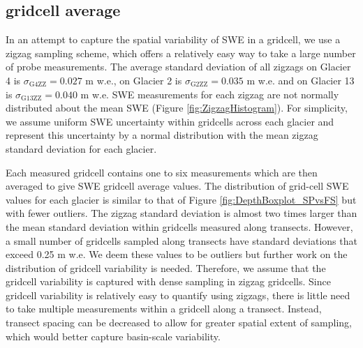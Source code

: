 \documentclass[twocolumn, letterpaper]{igs}
\begin{document}
\subsection{gridcell average}

In an attempt to capture the spatial variability of SWE in a gridcell, we use a zigzag sampling scheme, which offers a relatively easy way to take a large number of probe measurements. The average standard deviation of all zigzags on Glacier 4 is $\sigma_{\mathrm{G4ZZ}} =  0.027$ m w.e., on Glacier 2 is $\sigma_{\mathrm{G2ZZ}} =  0.035$ m w.e. and on Glacier 13 is $\sigma_{\mathrm{G13ZZ}} =  0.040$ m w.e. SWE measurements for each zigzag are not normally distributed about the mean SWE (Figure \ref{fig:ZigzagHistogram}). For simplicity, we assume uniform SWE uncertainty within gridcells across each glacier and represent this uncertainty by a normal distribution with the mean zigzag standard deviation for each glacier. 

Each measured gridcell contains one to six measurements which are then averaged to give SWE gridcell average values. The distribution of grid-cell SWE values for each glacier is similar to that of Figure \ref{fig:DepthBoxplot_SPvsFS} but with fewer outliers. The zigzag standard deviation is almost two times larger than the mean standard deviation within gridcells measured along transects. However, a small number of gridcells sampled along transects have standard deviations that exceed 0.25 m w.e. We deem these values to be outliers but further work on the distribution of gridcell variability is needed. Therefore, we assume that the gridcell variability is captured with dense sampling in zigzag gridcells. Since gridcell variability is relatively easy to quantify using zigzags, there is little need to take multiple measurements within a gridcell along a transect. Instead, transect spacing can be decreased to allow for greater spatial extent of sampling, which would better capture basin-scale variability.   
\end{document}
